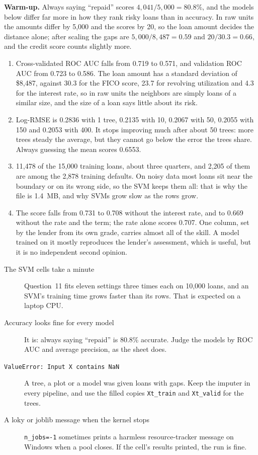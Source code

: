 \begin{expectedfindings}
\textbf{Warm-up.} Always saying ``repaid'' scores $4{,}041/5{,}000=80.8\%$, and the models below differ far more in how they rank risky loans than in accuracy. In raw units the amounts differ by 5,000 and the scores by 20, so the loan amount decides the distance alone; after scaling the gaps are $5{,}000/8{,}487=0.59$ and $20/30.3=0.66$, and the credit score counts slightly more.
\begin{enumerate}
  \item Cross-validated ROC AUC falls from 0.719 to 0.571, and validation ROC AUC from 0.723 to 0.586. The loan amount has a standard deviation of \$8,487, against 30.3 for the FICO score, 23.7 for revolving utilization and 4.3 for the interest rate, so in raw units the neighbors are simply loans of a similar size, and the size of a loan says little about its risk.
  \item Log-RMSE is 0.2836 with 1 tree, 0.2135 with 10, 0.2067 with 50, 0.2055 with 150 and 0.2053 with 400. It stops improving much after about 50 trees: more trees steady the average, but they cannot go below the error the trees share. Always guessing the mean scores 0.6553.
  \item 11,478 of the 15,000 training loans, about three quarters, and 2,205 of them are among the 2,878 training defaults. On noisy data most loans sit near the boundary or on its wrong side, so the SVM keeps them all: that is why the file is 1.4~MB, and why SVMs grow slow as the rows grow.
  \item The score falls from 0.731 to 0.708 without the interest rate, and to 0.669 without the rate and the term; the rate alone scores 0.707. One column, set by the lender from its own grade, carries almost all of the skill. A model trained on it mostly reproduces the lender's assessment, which is useful, but it is no independent second opinion.
\end{enumerate}
\end{expectedfindings}

\begin{troubleshoot}
\begin{description}
  \item[The SVM cells take a minute] Question~11 fits eleven settings three times each on 10,000 loans, and an SVM's training time grows faster than its rows. That is expected on a laptop CPU.
  \item[Accuracy looks fine for every model] It is: always saying ``repaid'' is 80.8\% accurate. Judge the models by ROC AUC and average precision, as the sheet does.
  \item[\texttt{ValueError: Input X contains NaN}] A tree, a plot or a model was given loans with gaps. Keep the imputer in every pipeline, and use the filled copies \texttt{Xt\_train} and \texttt{Xt\_valid} for the trees.
  \item[A loky or joblib message when the kernel stops] \texttt{n\_jobs=-1} sometimes prints a harmless resource-tracker message on Windows when a pool closes. If the cell's results printed, the run is fine.
\end{description}
\end{troubleshoot}

